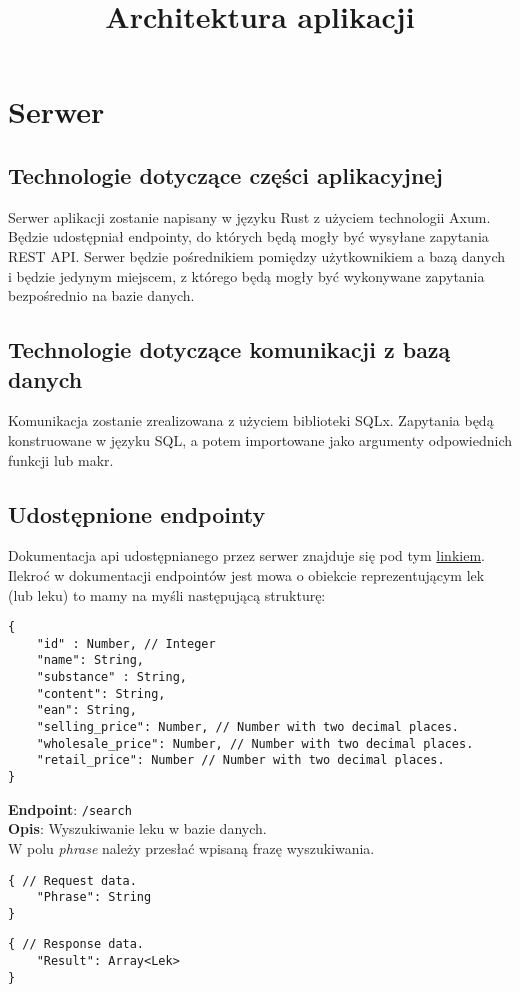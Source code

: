 \documentclass{article}
\title{\textbf{Architektura aplikacji}}
\begin{document}
\maketitle

\section{Serwer}

\subsection{Technologie dotyczące części aplikacyjnej}

Serwer aplikacji zostanie napisany w języku Rust z użyciem technologii Axum. Będzie udostępniał endpointy, do których będą mogły być wysyłane zapytania REST API. Serwer będzie pośrednikiem pomiędzy użytkownikiem a bazą danych i będzie jedynym miejscem, z którego będą mogły być wykonywane zapytania bezpośrednio na bazie danych.

\subsection{Technologie dotyczące komunikacji z bazą danych}

Komunikacja zostanie zrealizowana z użyciem biblioteki SQLx. Zapytania będą konstruowane w języku SQL, a potem importowane jako argumenty odpowiednich funkcji lub makr.

\subsection{Udostępnione endpointy}
Dokumentacja api udostępnianego przez serwer znajduje się pod tym \href{https://fuchczyk.github.io/io-swagger/}{linkiem}.
\iffalse
Ilekroć w dokumentacji endpointów jest mowa o obiekcie reprezentującym lek (lub leku) to mamy na myśli następującą strukturę:
\begin{verbatim}
{
    "id" : Number, // Integer
    "name": String,
    "substance" : String,
    "content": String,
    "ean": String,
    "selling_price": Number, // Number with two decimal places.
    "wholesale_price": Number, // Number with two decimal places.
    "retail_price": Number // Number with two decimal places.
}
\end{verbatim}

\textbf{Endpoint}: \verb|/search| \\
\textbf{Opis}: Wyszukiwanie leku w bazie danych. \\
W polu \textit{phrase} należy przesłać wpisaną frazę wyszukiwania.
\begin{multicols}{2}
\begin{verbatim}
{ // Request data.
    "Phrase": String
}
\end{verbatim}\breakd
\begin{verbatim}
{ // Response data.
    "Result": Array<Lek>
}
\end{verbatim}
\end{multicols}
\end{document}
